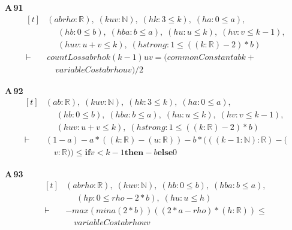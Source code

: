 \noindent\textbf{A\,91}\quad{}
{\footnotesize\[ \begin{aligned}[t]
&(\mathit{a} \mathit{b} \mathit{rho} : \mathbb{R} ),\; (\mathit{k} \mathit{u} \mathit{v} : \mathbb{N} ),\; (\mathit{hk} : 3 \leq \mathit{k}),\; (\mathit{ha} : 0 \leq \mathit{a}),\\
&\quad \; (\mathit{hb} : 0 \leq \mathit{b}),\; (\mathit{hba} : \mathit{b} \leq \mathit{a}),\; (\mathit{hu} : \mathit{u} \leq \mathit{k}),\; (\mathit{hv} : \mathit{v} \leq \mathit{k}-1),\\
&\quad \; (\mathit{huv} : \mathit{u}+\mathit{v} \leq \mathit{k}),\; (\mathit{hstrong} : 1 \leq ((\mathit{k}:\mathbb{R} )-2)*\mathit{b})\\
\vdash\;&\mathit{countLoss} \mathit{a} \mathit{b} \mathit{rho} \mathit{k} (\mathit{k}-1) \mathit{u} \mathit{v} = (\mathit{commonConstant} \mathit{a} \mathit{b} \mathit{k}+\\
&\quad \mathit{variableCost} \mathit{a} \mathit{b} \mathit{rho} \mathit{u} \mathit{v})/2
\end{aligned} \]}

\noindent\textbf{A\,92}\quad{}
{\footnotesize\[ \begin{aligned}[t]
&(\mathit{a} \mathit{b} : \mathbb{R} ),\; (\mathit{k} \mathit{u} \mathit{v} : \mathbb{N} ),\; (\mathit{hk} : 3 \leq \mathit{k}),\; (\mathit{ha} : 0 \leq \mathit{a}),\\
&\quad \; (\mathit{hb} : 0 \leq \mathit{b}),\; (\mathit{hba} : \mathit{b} \leq \mathit{a}),\; (\mathit{hu} : \mathit{u} \leq \mathit{k}),\; (\mathit{hv} : \mathit{v} \leq \mathit{k}-1),\\
&\quad \; (\mathit{huv} : \mathit{u}+\mathit{v} \leq \mathit{k}),\; (\mathit{hstrong} : 1 \leq ((\mathit{k}:\mathbb{R} )-2)*\mathit{b})\\
\vdash\;&(1-\mathit{a})-\mathit{a}*((\mathit{k}:\mathbb{R} )-(\mathit{u}:\mathbb{R} ))-\mathit{b}*(((\mathit{k}-1:\mathbb{N} ):\mathbb{R} )-(\\
&\quad \mathit{v}:\mathbb{R} )) \leq \mathbf{if} \mathit{v} < \mathit{k}-1 \mathbf{then} -\mathit{b} \mathbf{else} 0
\end{aligned} \]}

\noindent\textbf{A\,93}\quad{}
{\footnotesize\[ \begin{aligned}[t]
&(\mathit{a} \mathit{b} \mathit{rho} : \mathbb{R} ),\; (\mathit{h} \mathit{u} \mathit{v} : \mathbb{N} ),\; (\mathit{hb} : 0 \leq \mathit{b}),\; (\mathit{hba} : \mathit{b} \leq \mathit{a}),\\
&\quad \; (\mathit{hp} : 0 \leq \mathit{rho}-2*\mathit{b}),\; (\mathit{hu} : \mathit{u} \leq \mathit{h})\\
\vdash\;&-\mathit{max} (\mathit{min} \mathit{a} (2*\mathit{b})) ((2*\mathit{a}-\mathit{rho})*(\mathit{h}:\mathbb{R} )) \leq\\
&\quad \mathit{variableCost} \mathit{a} \mathit{b} \mathit{rho} \mathit{u} \mathit{v}
\end{aligned} \]}

